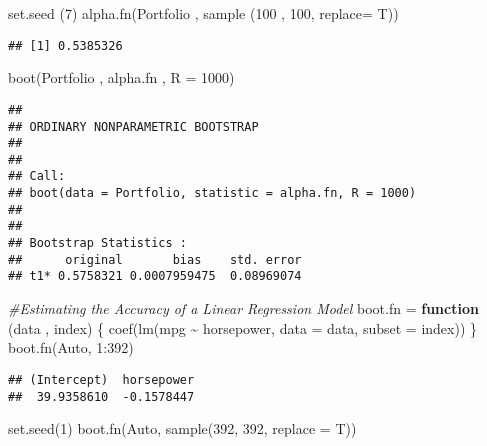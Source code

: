 \documentclass[
]{article}
\newenvironment{Shaded}{\begin{snugshade}}{\end{snugshade}}
\newcommand{\AttributeTok}[1]{\textcolor[rgb]{0.77,0.63,0.00}{#1}}
\newcommand{\CommentTok}[1]{\textcolor[rgb]{0.56,0.35,0.01}{\textit{#1}}}
\newcommand{\ControlFlowTok}[1]{\textcolor[rgb]{0.13,0.29,0.53}{\textbf{#1}}}
\newcommand{\DecValTok}[1]{\textcolor[rgb]{0.00,0.00,0.81}{#1}}
\newcommand{\FunctionTok}[1]{\textcolor[rgb]{0.00,0.00,0.00}{#1}}
\newcommand{\NormalTok}[1]{#1}
\newcommand{\OtherTok}[1]{\textcolor[rgb]{0.56,0.35,0.01}{#1}}
\newcommand{\SpecialCharTok}[1]{\textcolor[rgb]{0.00,0.00,0.00}{#1}}
\begin{document}
\begin{Shaded}
\begin{Highlighting}[]
\FunctionTok{set.seed}\NormalTok{ (}\DecValTok{7}\NormalTok{)}
\FunctionTok{alpha.fn}\NormalTok{(Portfolio , }\FunctionTok{sample}\NormalTok{ (}\DecValTok{100}\NormalTok{ , }\DecValTok{100}\NormalTok{, }\AttributeTok{replace=}\NormalTok{ T))}
\end{Highlighting}
\end{Shaded}

\begin{verbatim}
## [1] 0.5385326
\end{verbatim}

\begin{Shaded}
\begin{Highlighting}[]
\FunctionTok{boot}\NormalTok{(Portfolio , alpha.fn , }\AttributeTok{R =} \DecValTok{1000}\NormalTok{)}
\end{Highlighting}
\end{Shaded}

\begin{verbatim}
## 
## ORDINARY NONPARAMETRIC BOOTSTRAP
## 
## 
## Call:
## boot(data = Portfolio, statistic = alpha.fn, R = 1000)
## 
## 
## Bootstrap Statistics :
##      original       bias    std. error
## t1* 0.5758321 0.0007959475  0.08969074
\end{verbatim}

\begin{Shaded}
\begin{Highlighting}[]
\CommentTok{\#Estimating the Accuracy of a Linear Regression Model}
\NormalTok{boot.fn }\OtherTok{=} \ControlFlowTok{function}\NormalTok{ (data , index) \{}
  \FunctionTok{coef}\NormalTok{(}\FunctionTok{lm}\NormalTok{(mpg }\SpecialCharTok{\textasciitilde{}}\NormalTok{ horsepower, }\AttributeTok{data =}\NormalTok{ data, }\AttributeTok{subset =}\NormalTok{ index))}
\NormalTok{\}}
\FunctionTok{boot.fn}\NormalTok{(Auto, }\DecValTok{1}\SpecialCharTok{:}\DecValTok{392}\NormalTok{)}
\end{Highlighting}
\end{Shaded}

\begin{verbatim}
## (Intercept)  horsepower 
##  39.9358610  -0.1578447
\end{verbatim}

\begin{Shaded}
\begin{Highlighting}[]
\FunctionTok{set.seed}\NormalTok{(}\DecValTok{1}\NormalTok{)}
\FunctionTok{boot.fn}\NormalTok{(Auto, }\FunctionTok{sample}\NormalTok{(}\DecValTok{392}\NormalTok{, }\DecValTok{392}\NormalTok{, }\AttributeTok{replace =}\NormalTok{ T))}
\end{Highlighting}
\end{Shaded}
\end{document}
